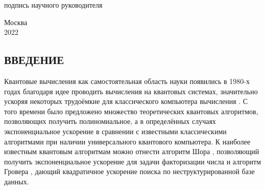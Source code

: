 \documentclass[14pt]{extarticle}
\renewcommand{\baselinestretch}{1.5}
\renewcommand{\baselinestretch}{1.5}
\begin{document}
\begin{titlepage}
\begin{minipage}{0.48\textwidth}
\begin{center}
\linespread{1}
{\small \centering подпись научного руководителя\par}
\linespread{1.5}
\end{center}
\end{minipage}%

\vfill

\begin{minipage}{0.45\textwidth}
\end{minipage}%

\vspace*{\fill}
{\centering Москва\\ 2022 \par}

\end{titlepage}

\setcounter{page}{2}

\newpage


\setcounter{page}{2}

\begin{center}
\tableofcontents
\end{center}

\newpage


\begin{center}
\section*{ВВЕДЕНИЕ}
\end{center}




\qquad Квантовые вычисления как самостоятельная область науки появились в 1980-х годах благодаря идее проводить вычисления на квантовых системах, значительно ускоряя  некоторых трудоёмкие для классического компьютера вычисления \cite{feynman1982simulating}. С того времени было предложено множество теоретических квантовых алгоритмов, позволяющих получить полиномиальное, а в определённых случаях экспоненциальное ускорение в сравнении с известными классическими алгоритмами при наличии универсального квантового компьютера. К наиболее известным квантовым алгоритмам можно отнести алгоритм Шора \cite{Shor}, позволяющий получить экспоненциальное ускорение для задачи факторизации числа и алгоритм Гровера \cite{Grover}, дающий квадратичное ускорение поиска по неструктурированной базе данных.
\end{document}
